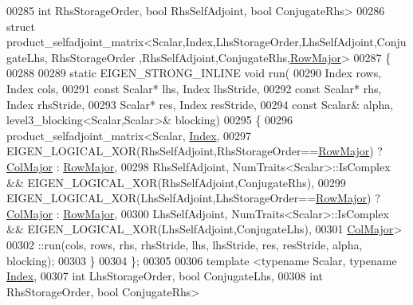 \begin{DoxyCode}
00285           \textcolor{keywordtype}{int} RhsStorageOrder, \textcolor{keywordtype}{bool} RhsSelfAdjoint, \textcolor{keywordtype}{bool} ConjugateRhs>
00286 \textcolor{keyword}{struct }product\_selfadjoint\_matrix<Scalar,Index,LhsStorageOrder,LhsSelfAdjoint,ConjugateLhs, RhsStorageOrder
      ,RhsSelfAdjoint,ConjugateRhs,\hyperlink{group__enums_ggaacded1a18ae58b0f554751f6cdf9eb13acfcde9cd8677c5f7caf6bd603666aae3}{RowMajor}>
00287 \{
00288 
00289   \textcolor{keyword}{static} EIGEN\_STRONG\_INLINE \textcolor{keywordtype}{void} run(
00290     Index rows, Index cols,
00291     \textcolor{keyword}{const} Scalar* lhs, Index lhsStride,
00292     \textcolor{keyword}{const} Scalar* rhs, Index rhsStride,
00293     Scalar* res,       Index resStride,
00294     \textcolor{keyword}{const} Scalar& alpha, level3\_blocking<Scalar,Scalar>& blocking)
00295   \{
00296     product\_selfadjoint\_matrix<Scalar, \hyperlink{namespace_eigen_a62e77e0933482dafde8fe197d9a2cfde}{Index},
00297       EIGEN\_LOGICAL\_XOR(RhsSelfAdjoint,RhsStorageOrder==\hyperlink{group__enums_ggaacded1a18ae58b0f554751f6cdf9eb13acfcde9cd8677c5f7caf6bd603666aae3}{RowMajor}) ? 
      \hyperlink{group__enums_ggaacded1a18ae58b0f554751f6cdf9eb13a0cbd4bdd0abcfc0224c5fcb5e4f6669a}{ColMajor} : \hyperlink{group__enums_ggaacded1a18ae58b0f554751f6cdf9eb13acfcde9cd8677c5f7caf6bd603666aae3}{RowMajor},
00298       RhsSelfAdjoint, NumTraits<Scalar>::IsComplex && EIGEN\_LOGICAL\_XOR(RhsSelfAdjoint,ConjugateRhs),
00299       EIGEN\_LOGICAL\_XOR(LhsSelfAdjoint,LhsStorageOrder==\hyperlink{group__enums_ggaacded1a18ae58b0f554751f6cdf9eb13acfcde9cd8677c5f7caf6bd603666aae3}{RowMajor}) ? 
      \hyperlink{group__enums_ggaacded1a18ae58b0f554751f6cdf9eb13a0cbd4bdd0abcfc0224c5fcb5e4f6669a}{ColMajor} : \hyperlink{group__enums_ggaacded1a18ae58b0f554751f6cdf9eb13acfcde9cd8677c5f7caf6bd603666aae3}{RowMajor},
00300       LhsSelfAdjoint, NumTraits<Scalar>::IsComplex && EIGEN\_LOGICAL\_XOR(LhsSelfAdjoint,ConjugateLhs),
00301       \hyperlink{group__enums_ggaacded1a18ae58b0f554751f6cdf9eb13a0cbd4bdd0abcfc0224c5fcb5e4f6669a}{ColMajor}>
00302       ::run(cols, rows,  rhs, rhsStride,  lhs, lhsStride,  res, resStride,  alpha, blocking);
00303   \}
00304 \};
00305 
00306 \textcolor{keyword}{template} <\textcolor{keyword}{typename} Scalar, \textcolor{keyword}{typename} \hyperlink{namespace_eigen_a62e77e0933482dafde8fe197d9a2cfde}{Index},
00307           \textcolor{keywordtype}{int} LhsStorageOrder, \textcolor{keywordtype}{bool} ConjugateLhs,
00308           \textcolor{keywordtype}{int} RhsStorageOrder, \textcolor{keywordtype}{bool} ConjugateRhs>

\end{DoxyCode}
